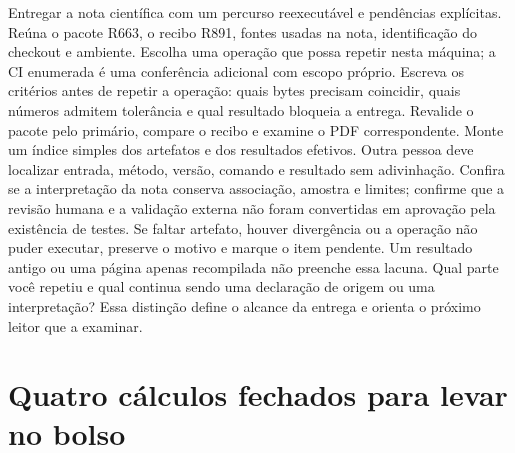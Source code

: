 \praticacore
{Entregar a nota científica com um percurso reexecutável e pendências explícitas.}
{Reúna o pacote R663, o recibo R891, fontes usadas na nota, identificação do checkout e ambiente. Escolha uma operação que possa repetir nesta máquina; a CI enumerada é uma conferência adicional com escopo próprio.}
{Escreva os critérios antes de repetir a operação: quais bytes precisam coincidir, quais números admitem tolerância e qual resultado bloqueia a entrega. Revalide o pacote pelo primário, compare o recibo e examine o PDF correspondente. Monte um índice simples dos artefatos e dos resultados efetivos.}
{Outra pessoa deve localizar entrada, método, versão, comando e resultado sem adivinhação. Confira se a interpretação da nota conserva associação, amostra e limites; confirme que a revisão humana e a validação externa não foram convertidas em aprovação pela existência de testes.}
{Se faltar artefato, houver divergência ou a operação não puder executar, preserve o motivo e marque o item pendente. Um resultado antigo ou uma página apenas recompilada não preenche essa lacuna.}
{Qual parte você repetiu e qual continua sendo uma declaração de origem ou uma interpretação? Essa distinção define o alcance da entrega e orienta o próximo leitor que a examinar.}

\section{Quatro c\'alculos fechados para levar no bolso}

